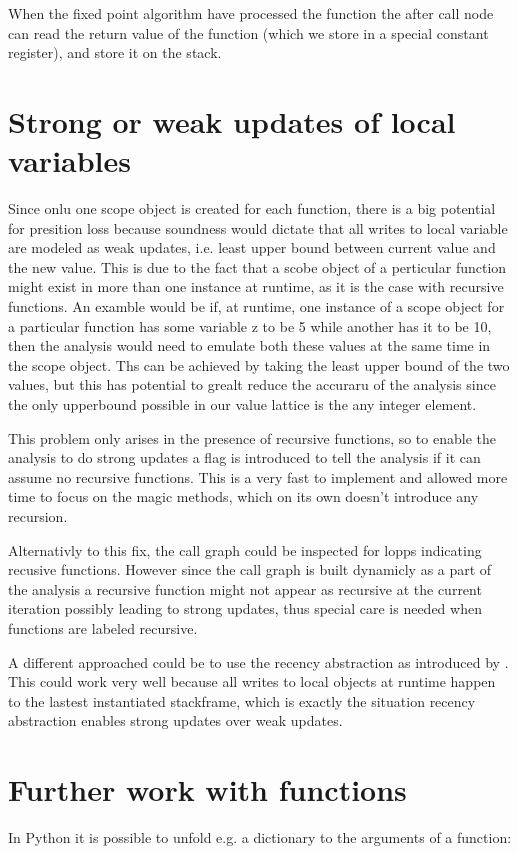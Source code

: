When the fixed point algorithm have processed the function the after call node can read the return value of the function (which we store in a special constant register), and store it on the stack.

\section{Strong or weak updates of local variables}
Since onlu one scope object is created for each function, there is a big potential for presition loss because soundness would dictate that all writes to local variable are modeled as weak updates, i.e. least upper bound between current value and the new value. This is due to the fact that a scobe object of a perticular function might exist in more than one instance at runtime, as it is the case with recursive functions. An examble would be if, at runtime, one instance of a scope object for a particular function has some variable z to be 5 while another has it to be 10, then the analysis would need to emulate both these values at the same time in the scope object. Ths can be achieved by taking the least upper bound of the two values, but this has potential to grealt reduce the accuraru of the analysis since the only upperbound possible in our value lattice is the any integer element.

This problem only arises in the presence of recursive functions, so to enable the analysis to do strong updates a flag is introduced to tell the analysis if it can assume no recursive functions. This is a very fast to implement and allowed more time to focus on the magic methods, which on its own doesn't introduce any recursion.

Alternativly to this fix, the call graph could be inspected for lopps indicating recusive functions. However since the call graph is built dynamicly as a part of the analysis a recursive function might not appear as recursive at the current iteration possibly leading to strong updates, thus special care is needed when functions are labeled recursive.

A different approached could be to use the recency abstraction as introduced by \cite{recency}. This could work very well because all writes to local objects at runtime happen to the lastest instantiated stackframe, which is exactly the situation recency abstraction enables strong updates over weak updates.

\section{Further work with functions}
In Python it is possible to unfold e.g. a dictionary to the arguments of a function:

